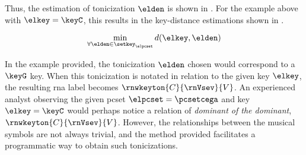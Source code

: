 Thus, the estimation of tonicization $\elden$ is shown in
. For the example above with
$\elkey = \keyC$, this results in the key-distance
estimations shown in
.

\begin{equation}
    \label{eq:tonicization_estimation}
    \min_{\forall \elden \in \setkey_\elpcset} d(\elkey, \elden)
\end{equation}



In the example provided, the tonicization $\elden$ chosen
would correspond to a $\keyG$ key. When this tonicization is
notated in relation to the given key $\elkey$, the resulting
\gls{rna} label becomes $\rnwkeyton{C}{\rnVsev}{V}$. An
experienced analyst observing the given \gls{pcset}
$\elpcset = \pcsetcega$ and key $\elkey = \keyC$ would
perhaps notice a relation of \emph{dominant of the
dominant}, $\rnwkeyton{C}{\rnVsev}{V}$. However, the
relationships between the musical symbols are not always
trivial, and the method provided facilitates a programmatic
way to obtain such tonicizations.
